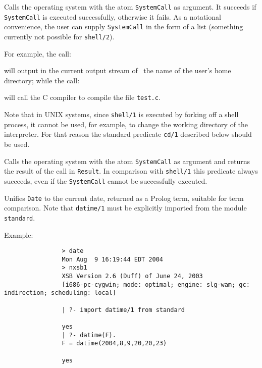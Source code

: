 \begin{description}

    Calls the operating system with the atom {\tt SystemCall} as argument.
    It succeeds if {\tt SystemCall} is executed successfully, otherwise it
    fails.  As a notational convenience, the user can supply {\tt SystemCall} 
    in the form of a list (something currently not possible for {\tt shell/2}).

    For example, the call:


    \noindent
    will output in the current output stream of \ourprolog\ the name of
    the user's home directory; while the call:


    \noindent
    will call the C compiler to compile the file {\tt test.c}.

    Note that in UNIX systems, since {\tt shell/1} is executed by
    forking off a shell process, it cannot be used, for example, to
    change the working directory of the interpreter.  For that reason
    the standard predicate {\tt cd/1} described below should be used.


    Calls the operating system with the atom {\tt SystemCall} as argument
    and returns the result of the call in {\tt Result}.  In comparison with
    {\tt shell/1} this predicate always succeeds, even if the {\tt SystemCall} 
    cannot be successfully executed.


Unifies {\tt Date} to the current date, returned as a Prolog term,
suitable for term comparison.  Note that {\tt datime/1} must be
explicitly imported from the module {\tt standard}.

Example:
{\footnotesize
\begin{verbatim}
                > date
                Mon Aug  9 16:19:44 EDT 2004
                > nxsb1
                XSB Version 2.6 (Duff) of June 24, 2003
                [i686-pc-cygwin; mode: optimal; engine: slg-wam; gc: indirection; scheduling: local]

                | ?- import datime/1 from standard

                yes
                | ?- datime(F).
                F = datime(2004,8,9,20,20,23)

                yes
\end{verbatim}}

\end{description}

